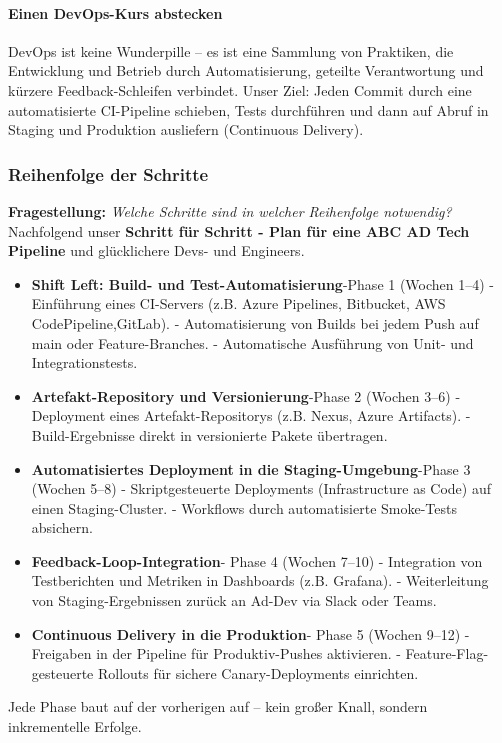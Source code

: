 \paragraph{Einen DevOps-Kurs abstecken}
DevOps ist keine Wunderpille – es ist eine Sammlung von Praktiken, die Entwicklung und Betrieb durch Automatisierung, geteilte Verantwortung und kürzere Feedback-Schleifen verbindet. 
Unser Ziel: Jeden Commit durch eine automatisierte CI-Pipeline schieben, Tests durchführen und dann auf Abruf in Staging und Produktion ausliefern (Continuous Delivery).


\subsubsection{Reihenfolge der Schritte}
\textbf{Fragestellung:} \textit{Welche Schritte sind in welcher Reihenfolge notwendig?}
Nachfolgend unser \textbf{Schritt für Schritt - Plan für eine ABC AD Tech Pipeline} und glücklichere Devs- und Engineers. 
\begin{itemize}
    \item \textbf{Shift Left: Build- und Test-Automatisierung}-Phase 1 (Wochen 1–4)
    \subitem- Einführung eines CI-Servers (z.B. Azure Pipelines, Bitbucket, AWS CodePipeline,GitLab).
    \subitem- Automatisierung von Builds bei jedem Push auf main oder Feature-Branches.
    \subitem- Automatische Ausführung von Unit- und Integrationstests.
    \item \textbf{Artefakt-Repository und Versionierung}-Phase 2 (Wochen 3–6)
    \subitem- Deployment eines Artefakt-Repositorys (z.B. Nexus, Azure Artifacts).
    \subitem- Build-Ergebnisse direkt in versionierte Pakete übertragen.
    \item \textbf{Automatisiertes Deployment in die Staging-Umgebung}-Phase 3 (Wochen 5–8)
    \subitem- Skriptgesteuerte Deployments (Infrastructure as Code) auf einen Staging-Cluster.
    \subitem- Workflows durch automatisierte Smoke-Tests absichern.
    \item \textbf{Feedback-Loop-Integration}- Phase 4 (Wochen 7–10)
    \subitem- Integration von Testberichten und Metriken in Dashboards (z.B. Grafana).
    \subitem- Weiterleitung von Staging-Ergebnissen zurück an Ad-Dev via Slack oder Teams.
    \item \textbf{Continuous Delivery in die Produktion}- Phase 5 (Wochen 9–12)
    \subitem- Freigaben in der Pipeline für Produktiv-Pushes aktivieren.
    \subitem- Feature-Flag-gesteuerte Rollouts für sichere Canary-Deployments einrichten.
\end{itemize}
Jede Phase baut auf der vorherigen auf – kein großer Knall, sondern inkrementelle Erfolge.

